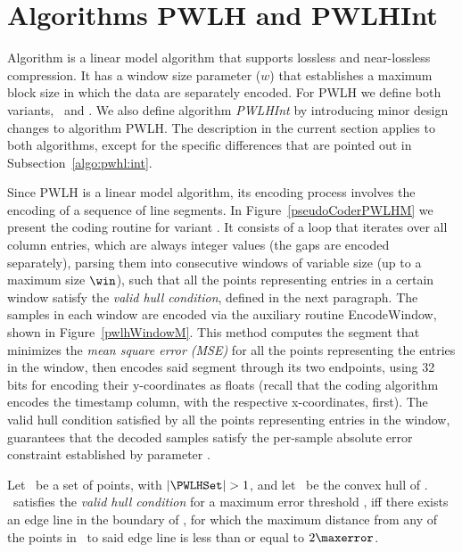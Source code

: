 

\section{Algorithms PWLH and PWLHInt}
\label{algo:pwlh}
\newcommand{\EncodeWindow}{EncodeWindow}


Algorithm \textit{\PWLHfull} \cite{coder:pwlh} is a linear model algorithm that supports lossless and near-lossless compression. It has a window size parameter ($w$) that establishes a maximum block size in which the data are separately encoded. For PWLH we define both variants, \maskalgo\ and \NOmaskalgo. We also define algorithm \textit{PWLHInt} by introducing minor design changes to algorithm PWLH. The description in the current section applies to both algorithms, except for the specific differences that are pointed out in Subsection~\ref{algo:pwhl:int}.


Since PWLH is a linear model algorithm, its encoding process involves the encoding of a sequence of line segments. In Figure~\ref{pseudoCoderPWLHM} we present the coding routine for variant \maskalgo. It consists of a loop that iterates over all column entries, which are always integer values (the gaps are encoded separately), parsing them into consecutive windows of variable size (up to a maximum size $\win$), such that all the points representing entries in a certain window satisfy the \textit{valid hull condition}, defined in the next paragraph. The samples in each window are encoded via the auxiliary routine \EncodeWindow, shown in Figure~\ref{pwlhWindowM}. This method computes the segment that minimizes the \textit{mean square error (MSE)} for all the points representing the entries in the window, then encodes said segment through its two endpoints, using 32 bits for encoding their y-coordinates as floats (recall that the coding algorithm encodes the timestamp column, with the respective x-coordinates, first). The valid hull condition satisfied by all the points representing entries in the window, guarantees that the decoded samples satisfy the per-sample absolute error constraint established by parameter \maxerror.

\clearpage








\vspace{+5pt}
\begin{defcion}
\label{def:validHull}
Let \PWLHSet\ be a set of points, with $|\PWLHSet|>1$, and let \hull\ be the convex hull of \PWLHSet. \hull\ satisfies the \textit{valid hull condition} for a maximum error threshold \maxerror, iff there exists an edge line in the boundary of \hull, for which the maximum distance from any of the points in \hull\ to said edge line is less than or equal to $2\maxerror$.
\end{defcion}


